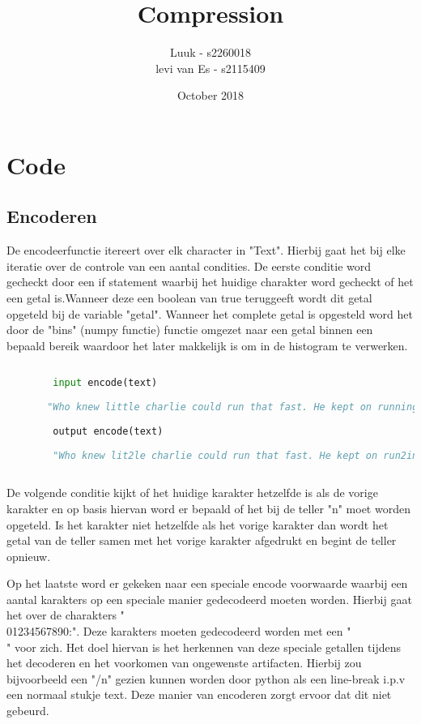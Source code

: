 \documentclass{article}
\title{Compression}
\author{Luuk - s2260018\\levi van Es - s2115409 }
\date{October 2018}
\begin{document}
\maketitle

\section{Code}

    \subsection{Encoderen}
       De encodeerfunctie itereert over elk character in "Text". Hierbij gaat het bij elke iteratie over de controle van een aantal condities. De eerste conditie word gecheckt door een if statement waarbij het huidige charakter word gecheckt of het een getal is.Wanneer deze een boolean van true teruggeeft wordt dit getal opgeteld bij de variable "getal". Wanneer het complete getal is opgesteld word het door de "bins" (numpy functie) functie omgezet naar een getal binnen een bepaald bereik waardoor het later makkelijk is om in de histogram te verwerken.
       
       
       \begin{lstlisting}[frame=single, language=python]  % Start your code-block
        
        input encode(text)
        
       "Who knew little charlie could run that fast. He kept on running faster fasteer and fasteeeeeerr !"
        
        output encode(text) 
        
        "Who knew lit2le charlie could run that fast. He kept on run2ing faster faste2r and faste6r2 !"
 

        \end{lstlisting}

       
       De volgende conditie kijkt of het huidige karakter hetzelfde is als de vorige karakter en op basis hiervan word er bepaald of het bij de teller "n" moet worden opgeteld. Is het karakter niet hetzelfde als het vorige karakter dan wordt het getal van de teller samen met het vorige karakter afgedrukt en begint de teller opnieuw.
       \newline
       
       Op het laatste word er gekeken naar een speciale encode voorwaarde waarbij een aantal karakters op een speciale manier gedecodeerd moeten worden. Hierbij gaat het over de charakters "\\01234567890:". Deze karakters moeten gedecodeerd worden met een "\\" voor zich. Het doel hiervan is het herkennen van deze speciale getallen tijdens het decoderen en het voorkomen van ongewenste artifacten. Hierbij zou bijvoorbeeld een "/n" gezien kunnen worden door python als een line-break i.p.v een normaal stukje text. Deze manier van encoderen zorgt ervoor dat dit niet gebeurd.
       
\end{document}
